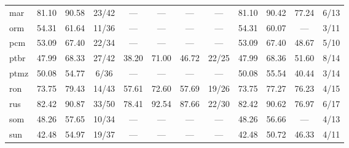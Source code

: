\begin{table*}[h]
{\begin{tabular}{l|ccc|cccc|cccc}
            mar               & 81.10                        & 90.58                        & 23/42                       & —              & —                   & —                & —             & 81.10          & 90.42               & 77.24            & 6/13          \\
            orm               & 54.31                        & 61.64                        & 11/36                       & —              & —                   & —                & —             & 54.31          & 60.07               & —                & 3/11          \\
            pcm               & 53.09                        & 67.40                        & 22/34                       & —              & —                   & —                & —             & 53.09          & 67.40               & 48.67            & 5/10          \\
            ptbr              & 47.99                        & 68.33                        & 27/42                       & 38.20          & 71.00               & 46.72            & 22/25         & 47.99          & 68.36               & 51.60            & 8/14          \\
            ptmz              & 50.08                        & 54.77                        & 6/36                        & —              & —                   & —                & —             & 50.08          & 55.54               & 40.44            & 3/14          \\
            ron               & 73.75                        & 79.43                        & 14/43                       & 57.61          & 72.60               & 57.69            & 19/26         & 73.75          & 77.27               & 76.23            & 4/15          \\
            rus               & 82.42                        & 90.87                        & 33/50                       & 78.41          & 92.54               & 87.66            & 22/30         & 82.42          & 90.62               & 76.97            & 6/17          \\
            som               & 48.26                        & 57.65                        & 10/34                       & —              & —                   & —                & —             & 48.26          & 56.66               & —                & 4/13          \\
            sun               & 42.48                        & 54.97                        & 19/37                       & —              & —                   & —                & —             & 42.48          & 50.72               & 46.33            & 4/11          \\

\end{tabular}}
\end{table*}
